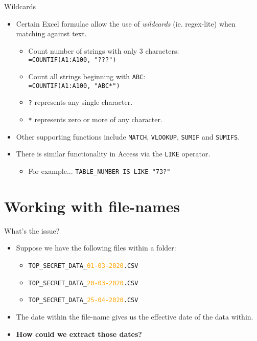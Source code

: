 \documentclass[
	usenames,
	dvipsnames,
] {beamer}
\begin{document}
\begin{frame}{Wildcards}
	\begin{itemize}[label=\textbullet]
		\item Certain Excel formulae allow the use of \textit{wildcards} (ie. regex-lite) when matching against text.
		      \pause

		      \begin{itemize}[label=\textendash]
			      	\item Count number of strings with only 3 characters:\\
			      	      \hfill\texttt{=COUNTIF(A1:A100, "???")}
			      	      \medskip
			      	      \pause
			      	\item Count all strings beginning with \texttt{ABC}:\\
			      	      \hfill\texttt{=COUNTIF(A1:A100, "ABC*")}
			      	      \medskip
			      	      \pause
			      	\item \texttt{?} represents any single character.
			      	      \pause
			      	\item \texttt{*} represents zero or more of any character.
			      		\pause
		      \end{itemize}
		      \medskip
		      
		\item Other supporting functions include \texttt{MATCH}, \texttt{VLOOKUP}, \texttt{SUMIF} and \texttt{SUMIFS}.
			\pause
		      \medskip		      
		\item There is similar functionality in Access via the \texttt{LIKE} operator.
		      \pause
		      \begin{itemize}
		      		\item For example... \hfill\texttt{TABLE\_NUMBER IS LIKE "73?"}
		      \end{itemize}
	\end{itemize}
\end{frame}
  
\section{Working with file-names}
\begin{frame}{What's the issue?}
	\begin{itemize}[label=\textbullet]
		\item<1-> Suppose we have the following files within a folder: \\
			\medskip
			\begin{itemize}
				\item<2-> \texttt{TOP\_SECRET\_DATA\_\textcolor<3->{orange}{01-03-2020}.CSV}
				\item<2-> \texttt{TOP\_SECRET\_DATA\_\textcolor<3->{orange}{20-03-2020}.CSV}
				\item<2-> \texttt{TOP\_SECRET\_DATA\_\textcolor<3->{orange}{25-04-2020}.CSV}
			\end{itemize}
		\item<3-> The date within the file-name gives us the effective date of the data within.
		\item<4-> \textbf{How could we extract those dates?}
	\end{itemize}
\end{frame}
    
\end{document}
